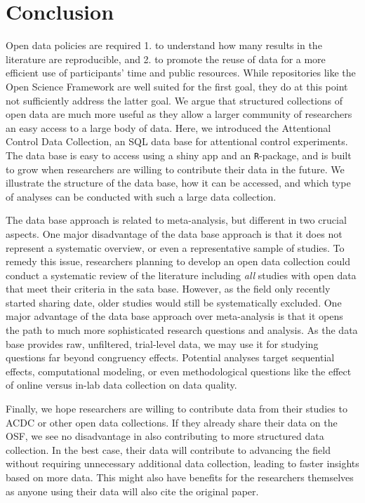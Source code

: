 \documentclass[
  man,floatsintext]{apa6}
\begin{document}
\hypertarget{conclusion}{%
\section{Conclusion}\label{conclusion}}

Open data policies are required 1. to understand how many results in the literature are reproducible, and 2. to promote the reuse of data for a more efficient use of participants' time and public resources. While repositories like the Open Science Framework are well suited for the first goal, they do at this point not sufficiently address the latter goal. We argue that structured collections of open data are much more useful as they allow a larger community of researchers an easy access to a large body of data. Here, we introduced the Attentional Control Data Collection, an SQL data base for attentional control experiments. The data base is easy to access using a shiny app and an \texttt{R}-package, and is built to grow when researchers are willing to contribute their data in the future. We illustrate the structure of the data base, how it can be accessed, and which type of analyses can be conducted with such a large data collection.

The data base approach is related to meta-analysis, but different in two crucial aspects. One major disadvantage of the data base approach is that it does not represent a systematic overview, or even a representative sample of studies. To remedy this issue, researchers planning to develop an open data collection could conduct a systematic review of the literature including \emph{all} studies with open data that meet their criteria in the sata base. However, as the field only recently started sharing date, older studies would still be systematically excluded. One major advantage of the data base approach over meta-analysis is that it opens the path to much more sophisticated research questions and analysis. As the data base provides raw, unfiltered, trial-level data, we may use it for studying questions far beyond congruency effects. Potential analyses target sequential effects, computational modeling, or even methodological questions like the effect of online versus in-lab data collection on data quality.

Finally, we hope researchers are willing to contribute data from their studies to ACDC or other open data collections. If they already share their data on the OSF, we see no disadvantage in also contributing to more structured data collection. In the best case, their data will contribute to advancing the field without requiring unnecessary additional data collection, leading to faster insights based on more data. This might also have benefits for the researchers themselves as anyone using their data will also cite the original paper.
\end{document}
